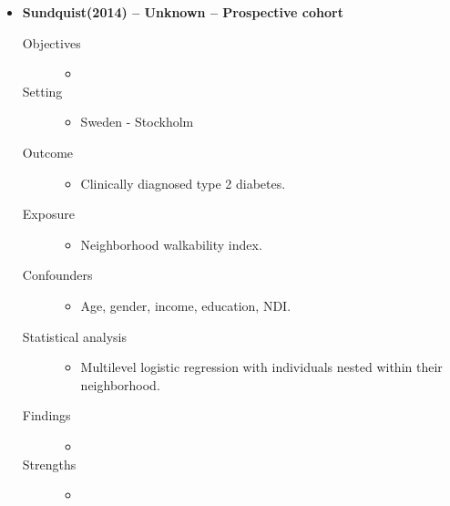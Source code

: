 \documentclass{article}
\begin{document}
\begin{itemize}
\item{\bf Sundquist(2014) -- Unknown  -- Prospective cohort} 
		\begin{description}
			\item[Objectives] \mbox{}\par
				\begin{itemize}
					\item 
				\end{itemize} 
			\item[Setting] \mbox{}\par
				\begin{itemize}
					\item Sweden - Stockholm 
				\end{itemize} 
			\item[Outcome]\mbox{}\par
				\begin{itemize}
					\item Clinically diagnosed type 2 diabetes.
				\end{itemize} 
			\item[Exposure] \mbox{}\par
				\begin{itemize}
					\item Neighborhood walkability index.  
				\end{itemize} 
			\item[Confounders] \mbox{}\par
				\begin{itemize}
					\item Age, gender, income, education, NDI. 
				\end{itemize} 
			\item[Statistical analysis] \mbox{}\par
				\begin{itemize}
					\item Multilevel logistic regression with individuals nested within their neighborhood. 
				\end{itemize} 
			\item[Findings]\mbox{}\par
				\begin{itemize}
					\item 
				\end{itemize}
			\item[Strengths]\mbox{}\par
				\begin{itemize}
					\item

\end{itemize}
\end{description}
\end{itemize}
\end{document}
